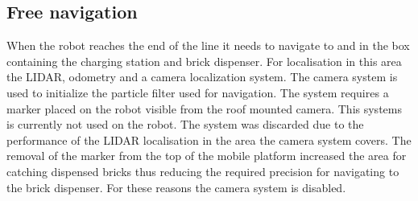     \subsection{Free navigation} %
    \label{sub:mr_free_navigation}

    When the robot reaches the end of the line it needs to navigate  to and in the box containing the charging station and brick dispenser. For localisation in this area the LIDAR, odometry and a camera localization system. The camera system is used to initialize the particle filter used for navigation. The system requires a marker placed on the robot visible from the roof mounted  camera. This systems is currently not used on the robot. The system was discarded due to the performance of the LIDAR localisation in the area the camera system covers. The removal of the marker from the top of the mobile platform increased the area for catching dispensed bricks thus reducing the required precision for navigating to the brick dispenser. For these reasons the camera system is disabled. 
    
